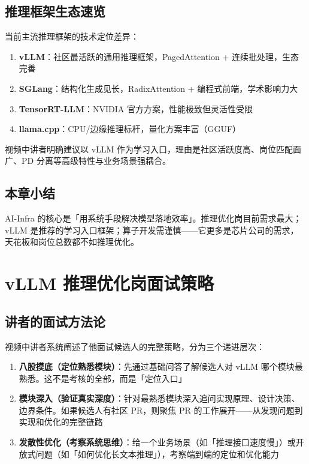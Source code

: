 \documentclass[a4paper]{article}
\begin{document}
\subsection{推理框架生态速览}

当前主流推理框架的技术定位差异：

\begin{enumerate}
  \item \textbf{vLLM}：社区最活跃的通用推理框架，PagedAttention + 连续批处理，生态完善
  \item \textbf{SGLang}：结构化生成见长，RadixAttention + 编程式前端，学术影响力大
  \item \textbf{TensorRT-LLM}：NVIDIA 官方方案，性能极致但灵活性受限
  \item \textbf{llama.cpp}：CPU/边缘推理标杆，量化方案丰富（GGUF）
\end{enumerate}

视频中讲者明确建议以 vLLM 作为学习入口，理由是社区活跃度高、岗位匹配面广、PD 分离等高级特性与业务场景强耦合。

\subsection{本章小结}

AI-Infra 的核心是「用系统手段解决模型落地效率」。推理优化岗目前需求最大；vLLM 是推荐的学习入口框架；算子开发需谨慎——它更多是芯片公司的需求，天花板和岗位总数都不如推理优化。

\section{vLLM 推理优化岗面试策略}

\subsection{讲者的面试方法论}

视频中讲者系统阐述了他面试候选人的完整策略，分为三个递进层次：

\begin{enumerate}
  \item \textbf{八股摸底（定位熟悉模块）}：先通过基础问答了解候选人对 vLLM 哪个模块最熟悉。这不是考核的全部，而是「定位入口」
  \item \textbf{模块深入（验证真实深度）}：针对最熟悉模块深入追问实现原理、设计决策、边界条件。如果候选人有社区 PR，则聚焦 PR 的工作展开——从发现问题到实现和优化的完整链路
  \item \textbf{发散性优化（考察系统思维）}：给一个业务场景（如「推理接口速度慢」）或开放式问题（如「如何优化长文本推理」），考察端到端的定位和优化能力
\end{enumerate}
\end{document}
